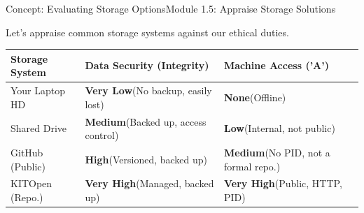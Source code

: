 \begin{frame}{Concept: Evaluating Storage Options}{Module 1.5: Appraise Storage Solutions}
    
    Let's appraise common storage systems against our ethical duties.
    \begin{center}
        \begin{tabular}{p{}|p{}|p{}}
            \toprule
            \textbf{Storage System} & \textbf{Data Security (Integrity)} & \textbf{Machine Access ('A')} \\
            \midrule
            
            \pause
            Your Laptop HD & \textcolor{HMCBlue!40}{\textbf{Very Low}\newline (No backup, easily lost)} & \textcolor{HMCBlue!20}{\textbf{None}\newline (Offline)} \\
            \addlinespace
            
            \pause
            Shared Drive & \textcolor{HMCBlue!80}{\textbf{Medium}\newline (Backed up, access control)} & \textcolor{HMCBlue!60}{\textbf{Low}\newline (Internal, not public)} \\
            \addlinespace
            
            \pause
            GitHub (Public) & \textcolor{HMCBlue}{\textbf{High}\newline (Versioned, backed up)} & \textcolor{HMCBlue!80}{\textbf{Medium}\newline (No PID, not a formal repo.)} \\
            \addlinespace
            
            \pause
            KITOpen (Repo.) & \textbf{Very High}\newline (Managed, backed up) & \textbf{Very High}\newline (Public, HTTP, PID) \\
            \bottomrule
        \end{tabular}
    \end{center}
\end{frame}


